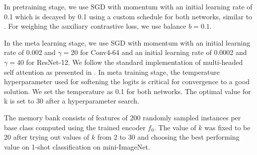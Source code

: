 \documentclass{bmvc2k}
\begin{document}
In pretraining stage, we use SGD with momentum with an initial learning rate of 0.1 which is decayed by 0.1 using a custom schedule for both networks, similar to \cite{ye2020few}. For weighing the auxiliary contrastive loss, we use balance $b=0.1$. 

In the meta learning stage, we use SGD with momentum with an initial learning rate of 0.002 and $\gamma=20$ for Conv4-64 and an initial learning rate of 0.0002 and $\gamma=40$ for ResNet-12. We follow the standard implementation of multi-headed self attention as presented in \cite{vaswani2017attention}. In meta training stage, the temperature hyperparameter used for softening the logits is critical for convergence to a good solution. We set the temperature as 0.1 for both networks. The optimal value for k is set to 30 after a hyperparameter search.

The memory bank consists of features of 200 randomly sampled instances per base class computed using the trained encoder \(f_0\). The value of $k$ was fixed to be 20 after trying out values of $k$ from 2 to 30 and choosing the best performing value on 1-shot classification on mini-ImageNet.
\end{document}

